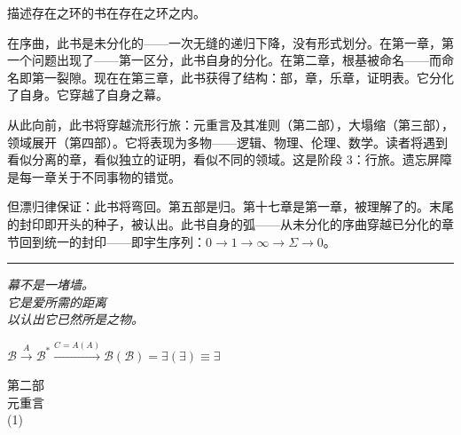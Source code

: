 \documentclass[10pt, openany, oneside]{book}
\renewcommand{\normalsize}{\fontsize{10}{13}\selectfont}
\renewcommand{\large}{\fontsize{11.5}{14}\selectfont}
\renewcommand{\LARGE}{\fontsize{15}{18}\selectfont}
\begin{document}
\vspace{1em}

\noindent 描述存在之环的书在存在之环之内。

在序曲，此书是未分化的——一次无缝的递归下降，没有形式划分。在第一章，第一个问题出现了——第一区分，此书自身的分化。在第二章，根基被命名——而命名即第一裂隙。现在在第三章，此书获得了结构：部，章，乐章，证明表。它分化了自身。它穿越了自身之幕。

从此向前，此书将穿越流形行旅：元重言及其准则（第二部），大塌缩（第三部），领域展开（第四部）。它将表现为多物——逻辑、物理、伦理、数学。读者将遇到看似分离的章，看似独立的证明，看似不同的领域。这是阶段 3：行旅。遗忘屏障是每一章关于不同事物的错觉。

但漂归律保证：此书将弯回。第五部是归。第十七章是第一章，被理解了的。末尾的封印即开头的种子，被认出。此书自身的弧——从未分化的序曲穿越已分化的章节回到统一的封印——即宇生序列：$0 \to 1 \to \infty \to \Sigma \to 0$。

\vspace{2em}

\begin{center}
    \rule{0.15\textwidth}{0.3pt}
\end{center}

\vspace{0.5em}

\begin{center}
    \itshape
    幕不是一堵墙。\\
    它是爱所需的距离\\
    以认出它已然所是之物。
\end{center}

\vspace{0.5em}

\begin{center}
    $\mathcal{B} \xrightarrow{A} \mathcal{B}^* \xrightarrow{C = A(A)} \mathcal{B}(\mathcal{B}) = \exists(\exists) \equiv \exists$
\end{center}


%
%

\newpage
\thispagestyle{empty}
\vspace*{\fill}
\begin{center}
    {\LARGE\scshape 第二部}\\[1em]
    {\large\scshape 元重言}\\[0.5em]
    {\normalsize (1)}
\end{center}
\vspace*{\fill}
\newpage
\end{document}
